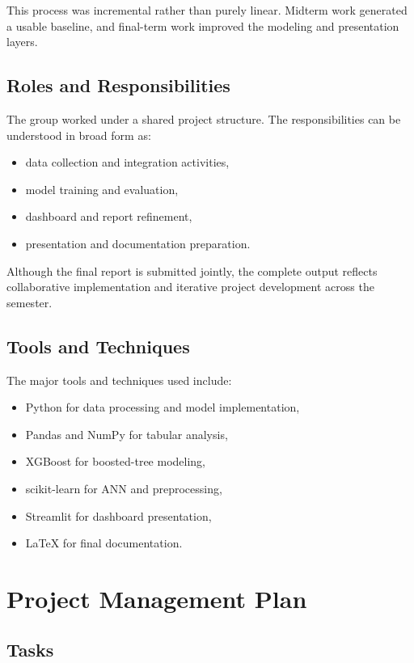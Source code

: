 \documentclass[12pt,a4paper]{report}
\begin{document}
This process was incremental rather than purely linear. Midterm work generated a usable baseline, and final-term work improved the modeling and presentation layers.

\subsection{Roles and Responsibilities}
The group worked under a shared project structure. The responsibilities can be understood in broad form as:

\begin{itemize}[leftmargin=1.3cm]
    \item data collection and integration activities,
    \item model training and evaluation,
    \item dashboard and report refinement,
    \item presentation and documentation preparation.
\end{itemize}

Although the final report is submitted jointly, the complete output reflects collaborative implementation and iterative project development across the semester.

\subsection{Tools and Techniques}
The major tools and techniques used include:

\begin{itemize}[leftmargin=1.3cm]
    \item Python for data processing and model implementation,
    \item Pandas and NumPy for tabular analysis,
    \item XGBoost for boosted-tree modeling,
    \item scikit-learn for ANN and preprocessing,
    \item Streamlit for dashboard presentation,
    \item LaTeX for final documentation.
\end{itemize}

\section{Project Management Plan}

\subsection{Tasks}
\end{document}
